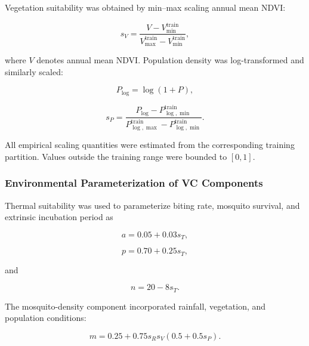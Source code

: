 \documentclass[10pt,twocolumn]{article}
\begin{document}
Vegetation suitability was obtained by min--max scaling annual mean
NDVI:

\begin{equation}
s_V =
\frac{
V-V_{\min}^{\mathrm{train}}
}{
V_{\max}^{\mathrm{train}}-V_{\min}^{\mathrm{train}}
},
\label{eq:vegetation_suitability}
\end{equation}

where \(V\) denotes annual mean NDVI. Population density was
log-transformed and similarly scaled:

\begin{equation}
P_{\log}=\log(1+P),
\end{equation}

\begin{equation}
s_P =
\frac{
P_{\log}-P_{\log,\min}^{\mathrm{train}}
}{
P_{\log,\max}^{\mathrm{train}}
-
P_{\log,\min}^{\mathrm{train}}
}.
\label{eq:population_suitability}
\end{equation}

All empirical scaling quantities were estimated from the corresponding
training partition. Values outside the training range were bounded to
\([0,1]\).


\subsubsection{Environmental Parameterization of VC Components}

Thermal suitability was used to parameterize biting rate, mosquito
survival, and extrinsic incubation period as

\begin{equation}
a = 0.05 + 0.03s_T,
\label{eq:biting_rate}
\end{equation}

\begin{equation}
p = 0.70 + 0.25s_T,
\label{eq:survival}
\end{equation}

and

\begin{equation}
n = 20 - 8s_T.
\label{eq:eip}
\end{equation}

The mosquito-density component incorporated rainfall, vegetation, and
population conditions:

\begin{equation}
m =
0.25 +
0.75s_Rs_V
\left(
0.5+0.5s_P
\right).
\label{eq:mosquito_density}
\end{equation}
\end{document}
